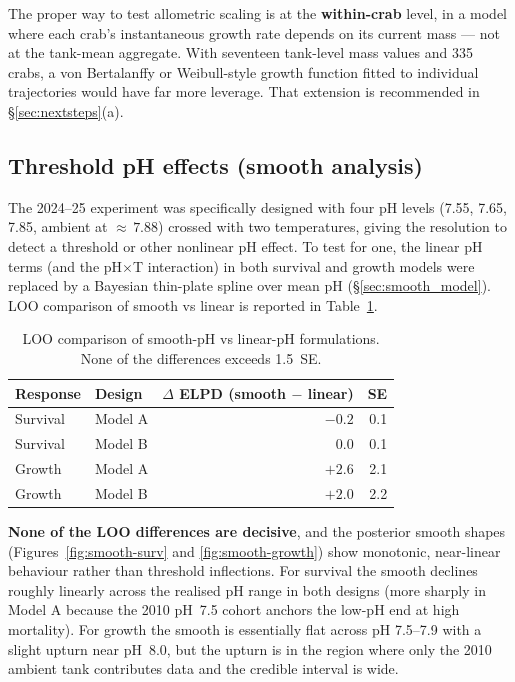 \documentclass[11pt]{article}
\begin{document}
The proper way to test allometric scaling is at the \textbf{within-crab} level, in a model where each crab's instantaneous growth rate depends on its current mass --- not at the tank-mean aggregate. With seventeen tank-level mass values and 335 crabs, a von Bertalanffy or Weibull-style growth function fitted to individual trajectories would have far more leverage. That extension is recommended in §\ref{sec:nextsteps}(a).

\clearpage
\subsection{Threshold pH effects (smooth analysis)}
\label{sec:threshold}
The 2024--25 experiment was specifically designed with four pH levels (7.55, 7.65, 7.85, ambient at ${\approx}\,7.88$) crossed with two temperatures, giving the resolution to detect a threshold or other nonlinear pH effect. To test for one, the linear pH terms (and the pH$\times$T interaction) in both survival and growth models were replaced by a Bayesian thin-plate spline over mean pH (§\ref{sec:smooth_model}). LOO comparison of smooth vs linear is reported in Table~\ref{tab:loo-smooth}.

\begin{table}[h]
\centering\small
\begin{tabular}{llrr}
\toprule
Response & Design & $\Delta$ ELPD (smooth $-$ linear) & SE \\
\midrule
Survival & Model A & $-0.2$ & 0.1 \\
Survival & Model B & 0.0    & 0.1 \\
Growth   & Model A & $+2.6$ & 2.1 \\
Growth   & Model B & $+2.0$ & 2.2 \\
\bottomrule
\end{tabular}
\caption{LOO comparison of smooth-pH vs linear-pH formulations. None of the differences exceeds 1.5~SE.}
\label{tab:loo-smooth}
\end{table}

\textbf{None of the LOO differences are decisive}, and the posterior smooth shapes (Figures~\ref{fig:smooth-surv} and \ref{fig:smooth-growth}) show monotonic, near-linear behaviour rather than threshold inflections. For survival the smooth declines roughly linearly across the realised pH range in both designs (more sharply in Model A because the 2010 pH~7.5 cohort anchors the low-pH end at high mortality). For growth the smooth is essentially flat across pH 7.5--7.9 with a slight upturn near pH~8.0, but the upturn is in the region where only the 2010 ambient tank contributes data and the credible interval is wide.
\end{document}
